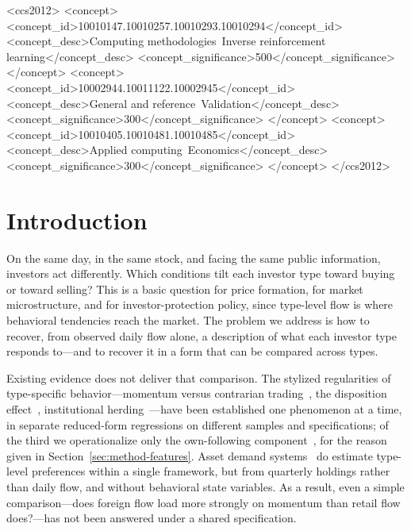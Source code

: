 \documentclass[sigconf,anonymous,review]{acmart}
\begin{document}
\begin{CCSXML}
<ccs2012>
 <concept>
  <concept_id>10010147.10010257.10010293.10010294</concept_id>
  <concept_desc>Computing methodologies~Inverse reinforcement learning</concept_desc>
  <concept_significance>500</concept_significance>
 </concept>
 <concept>
  <concept_id>10002944.10011122.10002945</concept_id>
  <concept_desc>General and reference~Validation</concept_desc>
  <concept_significance>300</concept_significance>
 </concept>
 <concept>
  <concept_id>10010405.10010481.10010485</concept_id>
  <concept_desc>Applied computing~Economics</concept_desc>
  <concept_significance>300</concept_significance>
 </concept>
</ccs2012>
\end{CCSXML}



\maketitle

\section{Introduction}

On the same day, in the same stock, and facing the same public
information, investors act differently. Which conditions tilt each
investor type toward buying or toward selling? This is a basic question
for price formation, for market microstructure, and for
investor-protection policy, since type-level flow is where behavioral
tendencies reach the market. The problem we address is how to
recover, from observed daily flow alone, a description of what each
investor type responds to---and to recover it in a form that can be
compared across types.

Existing evidence does not deliver that comparison. The stylized
regularities of type-specific behavior---momentum versus contrarian
trading~\cite{grinblatt_keloharju2001}, the disposition
effect~\cite{shefrin_statman,odean1998}, institutional
herding~\cite{lakonishok_shleifer_vishny}---have been established one
phenomenon at a time, in separate reduced-form regressions on different
samples and specifications; of the third we operationalize only the
own-following component~\cite{sias2004}, for the reason given in
Section~\ref{sec:method-features}. Asset demand systems~\cite{koijen_yogo2019}
do estimate type-level preferences within a single framework, but from
quarterly holdings rather than daily flow, and without behavioral state
variables. As a result, even a simple comparison---does foreign flow load
more strongly on momentum than retail flow does?---has not been answered
under a shared specification.
\end{document}
